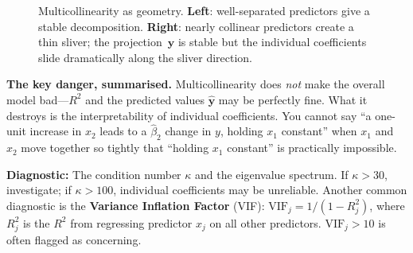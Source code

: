 \documentclass[11pt,a4paper]{article}
\theoremstyle{plain}
\theoremstyle{definition}
\newcommand{\yhat}{\hat{\bm{y}}}
\begin{document}
\begin{figure}[ht]
\caption{Multicollinearity as geometry.
\textbf{Left}: well-separated predictors give a stable decomposition.
\textbf{Right}: nearly collinear predictors create a thin sliver; the
projection~$\hat{\bm{y}}$ is stable but the individual coefficients
slide dramatically along the sliver direction.}
\label{fig:multicollinearity}
\end{figure}

\medskip
\noindent\textbf{The key danger, summarised.}
Multicollinearity does \emph{not} make the overall model bad---$R^2$ and the predicted values $\yhat$ may be perfectly fine.
What it destroys is the interpretability of individual coefficients.
You cannot say ``a one-unit increase in $x_2$ leads to a $\hat{\beta}_2$ change in $y$, holding $x_1$ constant'' when $x_1$ and $x_2$ move together so tightly that ``holding $x_1$ constant'' is practically impossible.

\medskip
\noindent\textbf{Diagnostic:} The condition number $\kappa$ and the
eigenvalue spectrum. If $\kappa > 30$, investigate; if $\kappa > 100$,
individual coefficients may be unreliable.
Another common diagnostic is the \textbf{Variance Inflation Factor}
(VIF): $\text{VIF}_j = 1/(1-R_j^2)$, where $R_j^2$ is the $R^2$ from
regressing predictor $x_j$ on all other predictors.
$\text{VIF}_j > 10$ is often flagged as concerning.
\end{document}
